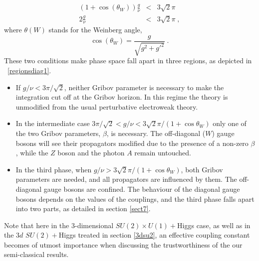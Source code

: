 \begin{subequations} 
\label{conds} 
\begin{eqnarray}
(1+\cos(\theta_{W}))\frac{g}{\nu} &<& 3\sqrt{2}\pi \label{firstcond} \\
2\frac{g}{\nu} &<& 3\sqrt{2}\pi \label{secondcond} \;,
\end{eqnarray} 
\end{subequations}
where $\theta(W)$ stands for the Weinberg angle,
\begin{equation}
\cos(\theta_{W}) = \frac{g}{\sqrt{g^{2}+g'^{2}}}\;.
\label{thW}
\end{equation}
These two conditions make phase space fall apart in three regions, as depicted in \figurename\ \ref{regionsdiag1}.
\begin{itemize}
	\item If $g/\nu<3\pi/\sqrt2$, neither Gribov parameter is necessary to make the integration cut off at the Gribov horizon. In this regime the theory is unmodified from the usual perturbative electroweak theory.
	\item In the intermediate case $3\pi/\sqrt2<g/\nu<3\sqrt2\pi/(1+\cos\theta_W)$ only one of the two Gribov parameters,  $\beta$, is necessary. The off-diagonal ($W$) gauge bosons will see their propagators modified due to the presence of a non-zero $\beta$, while the $Z$ boson and the photon $A$ remain untouched.
	\item In the third phase, when $g/\nu>3\sqrt2\pi/(1+\cos\theta_W)$, both Gribov parameters are needed, and all propagators are influenced by them. The off-diagonal gauge bosons are confined. The behaviour of the diagonal gauge bosons depends on the values of the couplings, and the third phase falls apart into two parts, as detailed in section \ref{sect7}.
\end{itemize}
Note that here in the $3$-dimensional $SU(2)\times U(1)+$Higgs case, as well as in the $3d$ $SU(2)+$Higgs treated in section \ref{3dsu2}, an effective coupling constant becomes of utmost importance when discussing the trustworthiness of the our semi-classical results.

